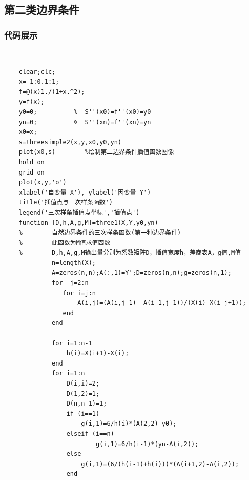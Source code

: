 \documentclass[UTF8,a4paper,10pt]{ctexart}
\begin{document}
  \subsection{第二类边界条件}
  \subsubsection{代码展示}
  ~\\
  \lstset{language=matlab}
  \begin{lstlisting}
    clear;clc;
    x=-1:0.1:1;
    f=@(x)1./(1+x.^2);
    y=f(x);
    y0=0;          %  S''(x0)=f''(x0)=y0   
    yn=0;          %  S''(xn)=f''(xn)=yn
    x0=x;
    s=threesimple2(x,y,x0,y0,yn)
    plot(x0,s)        %绘制第二边界条件插值函数图像
    hold on
    grid on
    plot(x,y,'o')
    xlabel('自变量 X'), ylabel('因变量 Y')
    title('插值点与三次样条函数') 
    legend('三次样条插值点坐标','插值点')
    function [D,h,A,g,M]=three1(X,Y,y0,yn)
    %        自然边界条件的三次样条函数(第一种边界条件)
    %        此函数为M值求值函数
    %        D,h,A,g,M输出量分别为系数矩阵D，插值宽度h，差商表A，g值,M值 
             n=length(X); 
             A=zeros(n,n);A(:,1)=Y';D=zeros(n,n);g=zeros(n,1);
             for  j=2:n
                for i=j:n
                    A(i,j)=(A(i,j-1)- A(i-1,j-1))/(X(i)-X(i-j+1));
                end
             end
             
             for i=1:n-1
                 h(i)=X(i+1)-X(i);
             end
             for i=1:n
                 D(i,i)=2; 
                 D(1,2)=1;
                 D(n,n-1)=1;
                 if (i==1)
                     g(i,1)=6/h(i)*(A(2,2)-y0); 
                 elseif (i==n) 
                         g(i,1)=6/h(i-1)*(yn-A(i,2));
                 else 
                     g(i,1)=(6/(h(i-1)+h(i)))*(A(i+1,2)-A(i,2));
                 end
               

\end{lstlisting}
\end{document}
